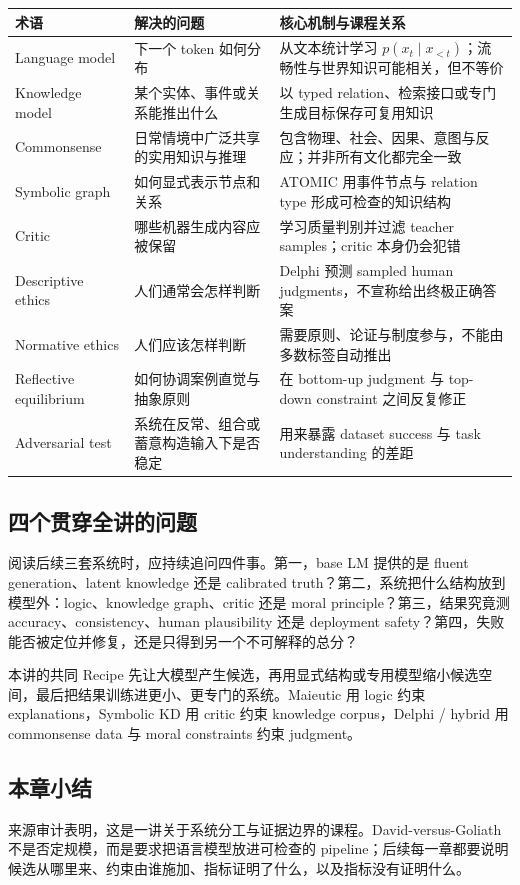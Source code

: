 \begin{longtable}{@{}L{0.19\textwidth}L{0.27\textwidth}L{0.42\textwidth}@{}}
\toprule
术语 & 解决的问题 & 核心机制与课程关系 \\
\midrule
Language model & 下一个 token 如何分布 & 从文本统计学习 $p(x_t\mid x_{<t})$；流畅性与世界知识可能相关，但不等价 \\
Knowledge model & 某个实体、事件或关系能推出什么 & 以 typed relation、检索接口或专门生成目标保存可复用知识 \\
Commonsense & 日常情境中广泛共享的实用知识与推理 & 包含物理、社会、因果、意图与反应；并非所有文化都完全一致 \\
Symbolic graph & 如何显式表示节点和关系 & ATOMIC 用事件节点与 relation type 形成可检查的知识结构 \\
Critic & 哪些机器生成内容应被保留 & 学习质量判别并过滤 teacher samples；critic 本身仍会犯错 \\
Descriptive ethics & 人们通常会怎样判断 & Delphi 预测 sampled human judgments，不宣称给出终极正确答案 \\
Normative ethics & 人们应该怎样判断 & 需要原则、论证与制度参与，不能由多数标签自动推出 \\
Reflective equilibrium & 如何协调案例直觉与抽象原则 & 在 bottom-up judgment 与 top-down constraint 之间反复修正 \\
Adversarial test & 系统在反常、组合或蓄意构造输入下是否稳定 & 用来暴露 dataset success 与 task understanding 的差距 \\
\bottomrule
\end{longtable}

\subsection{四个贯穿全讲的问题}

阅读后续三套系统时，应持续追问四件事。第一，base LM 提供的是 fluent generation、latent knowledge 还是 calibrated truth？第二，系统把什么结构放到模型外：logic、knowledge graph、critic 还是 moral principle？第三，结果究竟测 accuracy、consistency、human plausibility 还是 deployment safety？第四，失败能否被定位并修复，还是只得到另一个不可解释的总分？

\begin{importantbox}{本讲的共同 Recipe}
先让大模型产生候选，再用显式结构或专用模型缩小候选空间，最后把结果训练进更小、更专门的系统。Maieutic 用 logic 约束 explanations，Symbolic KD 用 critic 约束 knowledge corpus，Delphi / hybrid 用 commonsense data 与 moral constraints 约束 judgment。
\end{importantbox}

\subsection{本章小结}

来源审计表明，这是一讲关于系统分工与证据边界的课程。David-versus-Goliath 不是否定规模，而是要求把语言模型放进可检查的 pipeline；后续每一章都要说明候选从哪里来、约束由谁施加、指标证明了什么，以及指标没有证明什么。

